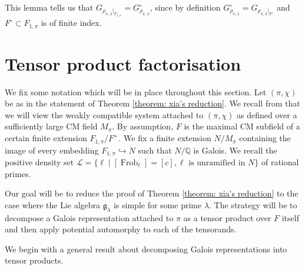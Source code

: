 \documentclass{amsart}
\theoremstyle{definition}
\numberwithin{equation}{section} %
\newcommand{\Frob}{\operatorname{Frob}}
\newcommand{\bb}[1]{\mathbb{#1}}
\newcommand{\mf}[1]{\mathfrak{#1}}
\begin{document}
This lemma tells us that \( G_{\rho_{\pi,\lambda}|_{F_{1,\pi}}} = G_{\rho_{\pi,\lambda}}^\circ \), since by definition \( G_{\rho_{\pi,\lambda}}^\circ = G_{\rho_{\pi,\lambda}|_{F^\circ}} \) and \( F^\circ\subset F_{1,\pi} \) is of finite index.


\section{Tensor product factorisation} \label{section: tensor decomposition}

We fix some notation which will be in place throughout this section.
Let $(\pi,\chi)$ be as in the statement of Theorem \ref{theorem: xia's reduction}.
We recall from  that we will view the weakly compatible system attached to $(\pi,\chi)$ as defined over a sufficiently large CM field $M_\pi$.
By assumption, $F$ is the maximal CM subfield of a certain finite extension $F_{1,\pi}/F^+$.
We fix a finite extension $N/M_\pi$ containing the image of every embedding $F_{1,\pi} \hookrightarrow N$ such that $N/\bb{Q}$ is Galois.
We recall the positive density set \(\mathcal{L} = \{\ell \mid [\Frob_\ell] = [c], \ell \text{ is unramified in } N \}\) of rational primes.

Our goal will be to reduce the proof of Theorem \ref{theorem: xia's reduction} to the case where the Lie algebra $\mf{g}_\lambda$ is simple for some prime $\lambda$.
The strategy will be to decompose a Galois representation attached to $\pi$ as a tensor product over $F$ itself and then apply potential automorphy to each of the tensorands.

We begin with a general result about decomposing Galois representations into tensor products.
\end{document}
